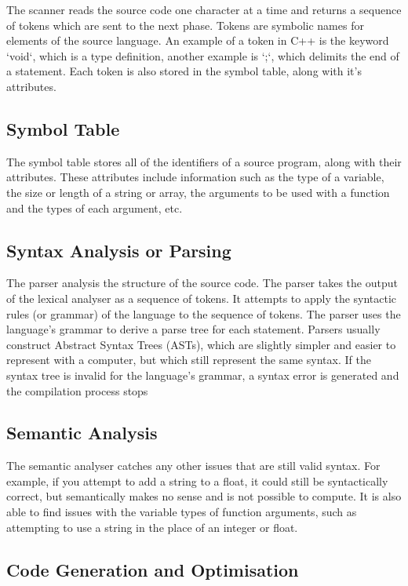 The scanner reads the source code one character at a time and returns a sequence of tokens which are sent to the next
 phase. Tokens are symbolic names for elements of the source language. An example of a token in C++ is the keyword
 `void`, which is a type definition, another example is `;`, which delimits the end of a statement. Each token is also
 stored in the symbol table, along with it's attributes.

\subsection*{Symbol Table}

The symbol table stores all of the identifiers of a source program, along with their attributes. These attributes
 include information such as the type of a variable, the size or length of a string or array, the arguments to be used
 with a function and the types of each argument, etc.

\subsection*{Syntax Analysis or Parsing}

The parser analysis the structure of the source code. The parser takes the output of the lexical analyser as a sequence
 of tokens. It attempts to apply the syntactic rules (or grammar) of the language to the sequence of tokens. The parser
 uses the language's grammar to derive a parse tree for each statement. Parsers usually construct Abstract Syntax Trees
 (ASTs), which are slightly simpler and easier to represent with a computer, but which still represent the same syntax.
 If the syntax tree is invalid for the language's grammar, a syntax error is generated and the compilation process stops

\subsection*{Semantic Analysis}

The semantic analyser catches any other issues that are still valid syntax. For example, if you attempt to add a string
 to a float, it could still be syntactically correct, but semantically makes no sense and is not possible to compute.
 It is also able to find issues with the variable types of function arguments, such as attempting to use a string in the
 place of an integer or float.

\subsection*{Code Generation and Optimisation}

